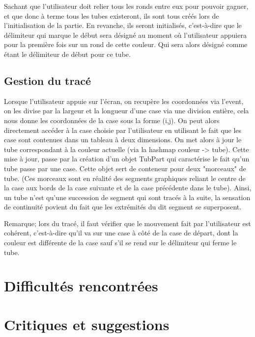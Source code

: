 \documentclass[12pt, a4paper]{article}%
\begin{document}
    Sachant que l'utilisateur doit relier tous les ronds entre eux pour pouvoir gagner, et que donc à terme tous les tubes
    existeront, ils sont tous créés lors de l'initialisation de la partie. En revanche, ils seront initialisés, c'est-à-dire que
    le délimiteur qui marque le début sera désigné au moment où l'utilisateur appuiera pour la première fois sur un rond de cette
    couleur. Qui sera alors désigné comme étant le délimiteur de début pour ce tube.
    \subsection{Gestion du tracé}
    Lorsque l'utilisateur appuie sur l'écran, on recupère les coordonnées via l'event, on les divise par la largeur et la longueur
    d'une case via une division entière, cela nous donne les coordonnées de la case sous la forme (i,j). On peut alors directement
    accéder à la case choisie par l'utilisateur en utilisant le fait que les case sont contenues dans un tableau à deux
    dimensions. On met alors à jour le tube correspondant à la couleur actuelle (via la hashmap couleur -> tube). Cette mise à
    jour, passe par la création d'un objet TubPart qui caractérise le fait qu'un tube passe par une case. Cette objet sert de
    conteneur pour deux "morceaux" de tube. (Ces morceaux sont en réalité des segments graphiques reliant le centre de la case aux
    bords de la case suivante et de la case précédente dans le tube). Ainsi, un tube n'est qu'une succession de segment qui sont
    tracés à la suite, la sensation de continuité povient du fait que les extrémités du dit segment se superposent.
    \newline

    Remarque; lors du tracé, il faut vérifier que le mouvement fait par l'utilisateur est cohérent, c'est-à-dire qu'il va sur une
    case à côté de la case de départ, dont la couleur est différente de la case sauf s'il se rend sur le délimiteur qui ferme le
    tube.
\section{Difficultés rencontrées}
\section{Critiques et suggestions}
\end{document}
